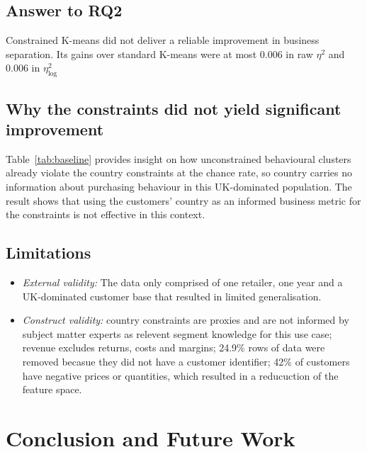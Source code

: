 \documentclass[conference,10pt]{IEEEtran}
\newcommand{\etasq}{\eta^{2}}
\begin{document}
\subsection{Answer to RQ2}
Constrained K-means did not deliver a reliable improvement in business
separation. Its gains over standard K-means were at most 0.006 in raw
$\etasq$ and 0.006 in $\etasq_{\log}$

\subsection{Why the constraints did not yield significant improvement}
Table~\ref{tab:baseline} provides insight on how unconstrained
behavioural clusters already violate the country constraints at the chance
rate, so country carries no information about purchasing behaviour in this
UK-dominated population. The result shows that using the customers' country as an informed business metric for the constraints is not effective in this context.


\subsection{Limitations}
\begin{itemize}
  \item \emph{External validity:} The data only comprised of one retailer, one year and a UK-dominated
  customer base that resulted in limited generalisation.
  \item \emph{Construct validity:} country constraints are proxies and are not informed by subject matter experts as relevent
  segment knowledge for this use case; revenue excludes returns, costs and margins; 24.9\% 
  rows of data were removed becasue they did not have a customer identifier; 42\% of customers have negative prices or quantities, which resulted in a reducuction of the feature space.
\end{itemize}

\section{Conclusion and Future Work}
\label{sec:conclusion}
\end{document}
